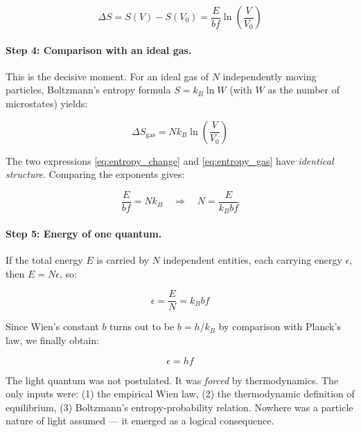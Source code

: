 \begin{equation}
    \Delta S = S(V) - S(V_0) = \frac{E}{bf} \ln\!\left(\frac{V}{V_0}\right)
    \label{eq:entropy_change}
\end{equation}

\paragraph{Step 4: Comparison with an ideal gas.}
This is the decisive moment. For an ideal gas of $N$ independently moving particles, 
Boltzmann's entropy formula $S = k_B \ln W$ (with $W$ as the number of microstates) 
yields:

\begin{equation}
    \Delta S_{\text{gas}} = N k_B \ln\!\left(\frac{V}{V_0}\right)
    \label{eq:entropy_gas}
\end{equation}

The two expressions \eqref{eq:entropy_change} and \eqref{eq:entropy_gas} have 
\emph{identical structure}. Comparing the exponents gives:

\begin{equation}
    \frac{E}{bf} = N k_B \quad \Longrightarrow \quad N = \frac{E}{k_B b f}
    \label{eq:quanta_count}
\end{equation}

\paragraph{Step 5: Energy of one quantum.}
If the total energy $E$ is carried by $N$ independent entities, each carrying energy 
$\epsilon$, then $E = N\epsilon$, so:

\begin{equation}
    \epsilon = \frac{E}{N} = k_B b f
    \label{eq:quantum_energy_wien}
\end{equation}

Since Wien's constant $b$ turns out to be $b = h/k_B$ by comparison with Planck's 
law, we finally obtain:

\begin{equation}
    \boxed{\epsilon = hf}
    \label{eq:quantum_energy_final}
\end{equation}

\begin{revolutionary}
    The light quantum was not postulated. It was \emph{forced} by thermodynamics. 
    The only inputs were: (1) the empirical Wien law, (2) the thermodynamic 
    definition of equilibrium, (3) Boltzmann's entropy-probability relation. 
    Nowhere was a particle nature of light assumed — it emerged as a logical 
    consequence.
\end{revolutionary}

